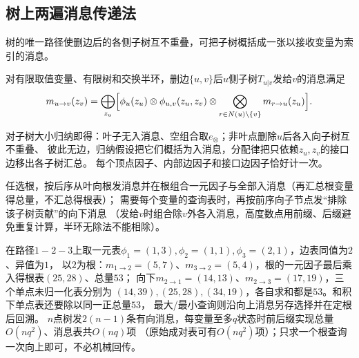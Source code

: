 \subsection{树上两遍消息传递法}
树的唯一路径使删边后的各侧子树互不重叠，可把子树概括成一张以接收变量为索引的消息。
\begin{theorem}[树消息递推]
  \label{thm:graph-theory-tree-message-recursion}
  对有限取值变量、有限树和交换半环，删边$\{u,v\}$后$u$侧子树$T_{u|v}$发给$v$的消息满足
  \begin{equation}
    m_{u\to v}(z_v)=\bigoplus_{z_u}\Bigl[
      \phi_u(z_u)\otimes\phi_{u,v}(z_u,z_v)
      \otimes\bigotimes_{r\in N(u)\setminus\{v\}}m_{r\to u}(z_u)\Bigr].
    \label{eq:graph-theory-tree-message-recursion}
  \end{equation}
\end{theorem}
对子树大小归纳即得：叶子无入消息、空组合取$e_\otimes$；非叶点删除$u$后各入向子树互不重叠、
彼此无边，归纳假设把它们概括为入消息，分配律把只依赖$z_u,z_v$的接口边移出各子树汇总。
每个顶点因子、内部边因子和接口边因子恰好计一次。
\begin{algorithm}[树上两遍消息]
  任选根，按后序从叶向根发消息并在根组合一元因子与全部入消息（再汇总根变量得总量，不汇总得根表）；
  需要每个变量的查询表时，再按前序向子节点发“排除该子树贡献”的向下消息
  （发给$v$时组合除$v$外各入消息，高度数点用前缀、后缀避免重复计算，半环无除法不能相除）。
\end{algorithm}
在路径$1-2-3$上取一元表$\phi_1=(1,3),\phi_2=(1,1),\phi_3=(2,1)$，边表同值为$2$、异值为$1$，
以$2$为根：$m_{1\to2}=(5,7)$、$m_{3\to2}=(5,4)$，根的一元因子最后乘入得根表$(25,28)$、总量$53$；
向下$m_{2\to1}=(14,13)$、$m_{2\to3}=(17,19)$，三个单点未归一化表分别为
$(14,39),(25,28),(34,19)$，各自求和都是$53$。和积下单点表还要除以同一正总量$53$，
最大/最小查询则沿向上消息另存选择并在定根后回溯。
$n$点树发$2(n-1)$条有向消息，每变量至多$q$状态时前后缀实现总量$O(nq^2)$、消息表共$O(nq)$项
（原始成对表可有$O(nq^2)$项）；只求一个根查询一次向上即可，不必机械回传。

